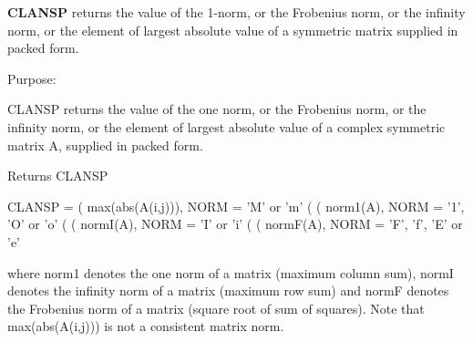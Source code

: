 {\bfseries C\+L\+A\+N\+S\+P} returns the value of the 1-\/norm, or the Frobenius norm, or the infinity norm, or the element of largest absolute value of a symmetric matrix supplied in packed form. 

 \begin{DoxyParagraph}{Purpose\+: }
\begin{DoxyVerb} CLANSP  returns the value of the one norm,  or the Frobenius norm, or
 the  infinity norm,  or the  element of  largest absolute value  of a
 complex symmetric matrix A,  supplied in packed form.\end{DoxyVerb}

\end{DoxyParagraph}
\begin{DoxyReturn}{Returns}
C\+L\+A\+N\+S\+P \begin{DoxyVerb}    CLANSP = ( max(abs(A(i,j))), NORM = 'M' or 'm'
             (
             ( norm1(A),         NORM = '1', 'O' or 'o'
             (
             ( normI(A),         NORM = 'I' or 'i'
             (
             ( normF(A),         NORM = 'F', 'f', 'E' or 'e'

 where  norm1  denotes the  one norm of a matrix (maximum column sum),
 normI  denotes the  infinity norm  of a matrix  (maximum row sum) and
 normF  denotes the  Frobenius norm of a matrix (square root of sum of
 squares).  Note that  max(abs(A(i,j)))  is not a consistent matrix norm.\end{DoxyVerb}
 
\end{DoxyReturn}

